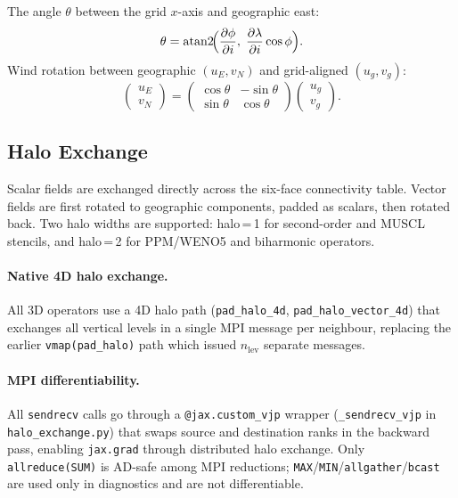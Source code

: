 \documentclass[11pt,twoside]{report}
\newcommand{\pp}{\partial}
\begin{document}
The angle $\theta$ between the grid $x$-axis and geographic east:
\begin{equation}
  \theta = \mathrm{atan2}\!\Bigl(\frac{\pp\phi}{\pp i},\;
  \frac{\pp\lambda}{\pp i}\cos\phi\Bigr).
\end{equation}
Wind rotation between geographic $(u_E,v_N)$ and grid-aligned $(u_g,v_g)$:
\begin{equation}
  \begin{pmatrix}u_E\\v_N\end{pmatrix}
  =\begin{pmatrix}\cos\theta&-\sin\theta\\\sin\theta&\cos\theta\end{pmatrix}
  \begin{pmatrix}u_g\\v_g\end{pmatrix}.
\end{equation}

\subsection{Halo Exchange}

Scalar fields are exchanged directly across the six-face connectivity table.
Vector fields are first rotated to geographic components, padded as scalars,
then rotated back.  Two halo widths are supported: halo\,=\,1 for second-order
and MUSCL stencils, and halo\,=\,2 for PPM/WENO5 and biharmonic operators.

\paragraph{Native 4D halo exchange.}
All 3D operators use a 4D halo path (\texttt{pad\_halo\_4d},
\texttt{pad\_halo\_vector\_4d}) that exchanges all vertical levels in a
single MPI message per neighbour, replacing the earlier
\texttt{vmap(pad\_halo)} path which issued $n_{\mathrm{lev}}$ separate
messages.

\paragraph{MPI differentiability.}
All \texttt{sendrecv} calls go through a \texttt{@jax.custom\_vjp}
wrapper (\texttt{\_sendrecv\_vjp} in \texttt{halo\_exchange.py}) that
swaps source and destination ranks in the backward pass, enabling
\texttt{jax.grad} through distributed halo exchange.  Only
\texttt{allreduce(SUM)} is AD-safe among MPI reductions;
\texttt{MAX}/\texttt{MIN}/\texttt{allgather}/\texttt{bcast} are used
only in diagnostics and are not differentiable.
\end{document}
